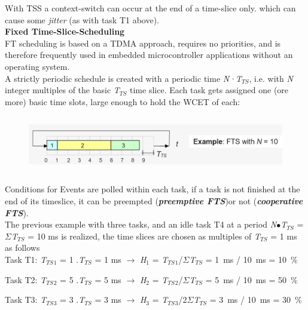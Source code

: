 With TSS a context-switch can occur at the end of a time-slice only. which can cause some \textit{jitter} (as with task T1 above).\\

{\rot\bf Fixed Time-Slice-Scheduling }\\

FT scheduling is based on a TDMA approach, requires no priorities, and is therefore frequently used in embedded microcontroller applications without an operating system.\\

A strictly periodic schedule is created with a periodic time \textit{N·T${}_{TS}$}, i.e. with \textit{N} integer multiples of the basic \textit{T${}_{TS}$} time slice. Each task gets assigned one (ore more) basic time slots, large enough to hold the WCET of each:\\

	\begin{figure}[h]
    \centering
    \includegraphics[width=14cm, height=2.5cm]{Images/image92.png}
    \label{fig:Fig }
    \end{figure}

Conditions for Events are polled within each task, if a task is not finished at the end of its timeslice, it can be preempted (\textbf{\textit{preemptive FTS}})or not (\textbf{\textit{cooperative FTS}}).\\

The previous example with three tasks, and an idle task T4 at a period \textit{N}$\mathrm{\bullet}$\textit{T${}_{TS}$} = $\Sigma$\textit{T${}_{TS}$} = 10 ms is realized, the time slices are chosen as multiples of \textit{T${}_{TS}$} = 1 ms as follows \\

Task T1:    \textit{T${}_{TS}$}${}_{1}$ = 1 $.$\textit{T${}_{TS}$} = 1 ms $\rightarrow$ \textit{H}${}_{1}$ = \textit{T${}_{TS}$}${}_{1}$/$\Sigma$\textit{T${}_{TS}$} = 1~ms / 10~ms = 10~\%

Task T2:    \textit{T${}_{TS}$}${}_{2}$ = 5 $.$\textit{T${}_{TS}$} = 5 ms $\rightarrow$ \textit{H}${}_{2}$ = \textit{T${}_{TS}$}${}_{2}$/$\Sigma$\textit{T${}_{TS}$} = 5~ms / 10~ms = 50~\%

Task T3:     \textit{T${}_{TS}$}${}_{3}$ = 3 $.$\textit{T${}_{TS}$} = 3 ms $\rightarrow$ \textit{H}${}_{3}$ = \textit{T${}_{TS}$}${}_{3}$/2$\Sigma$\textit{T${}_{TS}$} = 3~ms / 10~ms = 30~\%


